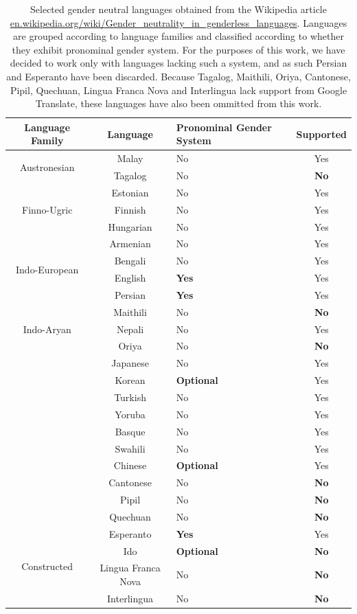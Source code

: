 \documentclass{article}
\begin{document}
\begin{table}[H]
	\centering
	\begin{tabular}{|c|c|m{3cm}|c|}
	\hline
	Language Family & Language & Pronominal Gender System & Supported \\ \hline \hline
	\multirow{2}{*}{Austronesian} & Malay & No & Yes \\
	& Tagalog & No & \textbf{No} \\ \hline
	\multirow{3}{*}{Finno-Ugric} & Estonian & No & Yes \\
	& Finnish & No & Yes\\
	& Hungarian & No & Yes \\ \hline
	\multirow{4}{*}{Indo-European} & Armenian & No & Yes \\
	& Bengali & No & Yes \\
	& English & \textbf{Yes} & Yes \\
	& Persian & \textbf{Yes} & Yes \\ \hline
	\multirow{3}{*}{Indo-Aryan} & Maithili & No & \textbf{No} \\
	& Nepali & No & Yes \\
	& Oriya & No & \textbf{No} \\ \hline
	\multirow{10}{*}{} & Japanese & No & Yes \\
	& Korean & \textbf{Optional} & Yes \\
	& Turkish & No & Yes \\
	& Yoruba & No & Yes \\
	& Basque & No & Yes \\
	& Swahili & No & Yes \\
	& Chinese & \textbf{Optional} & Yes \\
	& Cantonese & No & \textbf{No} \\
	& Pipil & No & \textbf{No} \\
	& Quechuan & No & \textbf{No} \\ \hline
	\multirow{4}{*}{Constructed} & Esperanto & \textbf{Yes} & Yes \\
	& Ido & \textbf{Optional} & \textbf{No} \\
	& Lingua Franca Nova & No & \textbf{No} \\
	& Interlingua & No & \textbf{No} \\ \hline
	\end{tabular}
	\caption{Selected gender neutral languages obtained from the Wikipedia article \url{en.wikipedia.org/wiki/Gender_neutrality_in_genderless_languages}. Languages are grouped according to language families and classified according to whether they exhibit pronominal gender system. For the purposes of this work, we have decided to work only with languages lacking such a system, and as such Persian and Esperanto have been discarded. Because Tagalog, Maithili, Oriya, Cantonese, Pipil, Quechuan, Lingua Franca Nova and Interlingua lack support from Google Translate, these languages have also been ommitted from this work.}
\end{table}
\end{document}
